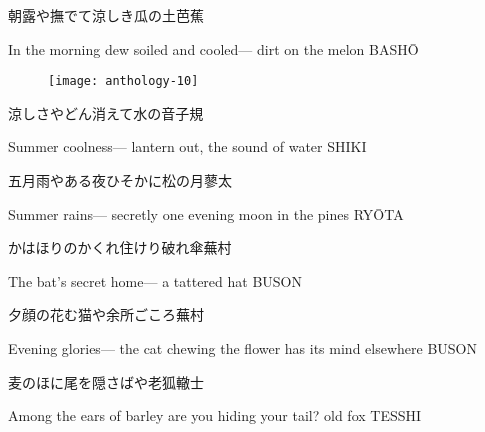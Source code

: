 \begin{haiku}
    {\FH 朝露や撫でて涼しき瓜の土}\hfill{\FH 芭蕉}

    \vin{} In the morning dew
    \vin{} \vin{} soiled and cooled---
    \vin{} \vin{} \vin{} dirt on the melon \hspace{\fill} BASH\={O}
\end{haiku}

\begin{figure}
    \texttt{[image: anthology-10]}
\end{figure}

\begin{haiku}
    {\FH 涼しさやどん消えて水の音}\hfill{\FH 子規}

    \vin{} Summer coolness---
    \vin{} \vin{} lantern out,
    \vin{} \vin{} \vin{} the sound of water \hspace{\fill} SHIKI
\end{haiku}

\begin{haiku}
    {\FH 五月雨やある夜ひそかに松の月}\hfill{\FH 蓼太}

    \vin{} Summer rains---
    \vin{} \vin{} secretly one evening
    \vin{} \vin{} \vin{} moon in the pines \hspace{\fill} RY\={O}TA
\end{haiku}

\begin{haiku}
    {\FH かはほりのかくれ住けり破れ傘}\hfill{\FH 蕪村}

    \vin{} The bat's
    \vin{} \vin{} secret home---
    \vin{} \vin{} \vin{} a tattered hat \hspace{\fill} BUSON
\end{haiku}

\begin{haiku}
    {\FH 夕顔の花む猫や余所ごころ}\hfill{\FH 蕪村}

    \vin{} Evening glories---
    \vin{} \vin{} the cat chewing the flower
    \vin{} \vin{} \vin{} has its mind elsewhere \hspace{\fill} BUSON
\end{haiku}

\begin{haiku}
    {\FH 麦のほに尾を隠さばや老狐}\hfill{\FH 轍士}

    \vin{} Among the ears of barley
    \vin{} \vin{} are you hiding your tail?
    \vin{} \vin{} \vin{} old fox \hspace{\fill} TESSHI
\end{haiku}

